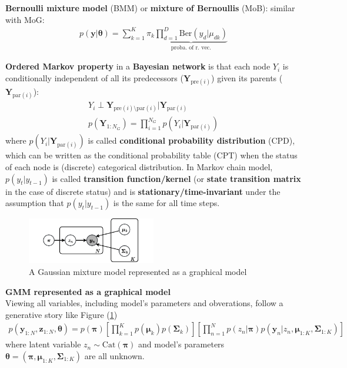 \textbf{Bernoulli mixture model} (BMM) or \textbf{mixture of Bernoullis} (MoB):
similar with MoG:
\begin{gather}
    p(\bm{y}|\bm{\theta})=\sum_{k=1}^K{\pi_k\underbrace{\prod_{d=1}^D\mathrm{Ber}(y_d|\mu_{dk})}_{\text{proba. of r. vec.}}}
\end{gather}

\textbf{Ordered Markov property} in a \textbf{Bayesian network} is that 
each node $Y_i$ is conditionally independent of all its predecessors ($\bm{Y}_{\text{pre}(i)}$) given its parents ($\bm{Y}_{\text{par}(i)}$):
\begin{gather}
    Y_i\perp\bm{Y}_{\text{pre}(i)\setminus\text{par}(i)}|\bm{Y}_{\text{par}(i)}\\
    p(\bm{Y}_{1:N_G})=\prod_{i=1}^{N_G}p\left(Y_i|\bm{Y}_{\text{par}(i)}\right)
\end{gather}
where $p\left(Y_i|\bm{Y}_{\text{par}(i)}\right)$ is called \textbf{conditional probability distribution} (CPD), 
which can be written as the conditional probability table (CPT) 
when the status of each node is (discrete) categorical distribution.
In Markov chain model, 
$p(y_t|y_{t-1})$ is called \textbf{transition function/kernel} (or \textbf{state transition matrix} in the case of discrete status) and is \textbf{stationary/time-invariant} under the assumption that $p(y_t|y_{t-1})$ is the same for all time steps.

\begin{figure}[hptb]
    \centering
    \includegraphics[width=0.5\textwidth]{figs/mixgaussian.pdf}
    \caption{A Gaussian mixture model represented as a graphical model}
    \label{fig:maxgaussian}
\end{figure}

\begin{example}
    \textbf{GMM represented as a graphical model}\\
    Viewing all variables, including model's parameters and obverations, 
    follow a generative story like Figure (\ref{fig:maxgaussian})
    {\small\begin{gather}
        p(\bm{y}_{1:N},\bm{z}_{1:N},\bm{\theta})
        = p(\bm{\pi})
        \left[ \prod_{k=1}^K p(\bm{\mu}_k)p(\bm{\Sigma}_k) \right]
        \left[ \prod_{n=1}^N p(z_n|\bm{\pi})p(\bm{y}_n|z_n,\bm{\mu}_{1:K},\bm{\Sigma}_{1:K}) \right]
    \end{gather}}
    where latent variable $z_n\sim\text{Cat}(\bm{\pi})$ and model's parameters
    $\bm{\theta}=(\bm{\pi},\bm{\mu}_{1:K},\bm{\Sigma}_{1:K})$ are all unknown.
\end{example}


